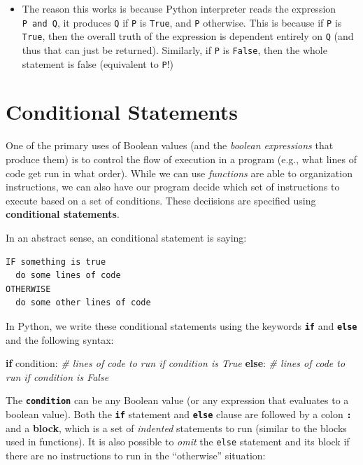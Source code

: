 \documentclass[]{book}
\newenvironment{Shaded}{\begin{snugshade}}{\end{snugshade}}
\newcommand{\CommentTok}[1]{\textcolor[rgb]{0.56,0.35,0.01}{\textit{#1}}}
\newcommand{\ControlFlowTok}[1]{\textcolor[rgb]{0.13,0.29,0.53}{\textbf{#1}}}
\newcommand{\NormalTok}[1]{#1}
\providecommand{\tightlist}{%
  \setlength{\itemsep}{0pt}\setlength{\parskip}{0pt}}
\begin{document}
\begin{itemize}
\tightlist
\item
  The reason this works is because Python interpreter reads the
  expression \texttt{P\ and\ Q}, it produces \texttt{Q} if \texttt{P} is
  \texttt{True}, and \texttt{P} otherwise. This is because if \texttt{P}
  is \texttt{True}, then the overall truth of the expression is
  dependent entirely on \texttt{Q} (and thus that can just be returned).
  Similarly, if \texttt{P} is \texttt{False}, then the whole statement
  is false (equivalent to \texttt{P}!)
\end{itemize}

\hypertarget{conditional-statements}{\section{Conditional
Statements}\label{conditional-statements}}

One of the primary uses of Boolean values (and the \emph{boolean
expressions} that produce them) is to control the flow of execution in a
program (e.g., what lines of code get run in what order). While we can
use \emph{functions} are able to organization instructions, we can also
have our program decide which set of instructions to execute based on a
set of conditions. These deciisions are specified using
\textbf{conditional statements}.

In an abstract sense, an conditional statement is saying:

\begin{verbatim}
IF something is true
  do some lines of code
OTHERWISE
  do some other lines of code
\end{verbatim}

In Python, we write these conditional statements using the keywords
\textbf{\texttt{if}} and \textbf{\texttt{else}} and the following
syntax:

\begin{Shaded}
\begin{Highlighting}[]
\ControlFlowTok{if}\NormalTok{ condition:}
    \CommentTok{# lines of code to run if condition is True}
\ControlFlowTok{else}\NormalTok{:}
    \CommentTok{# lines of code to run if condition is False}
\end{Highlighting}
\end{Shaded}

The \textbf{\texttt{condition}} can be any Boolean value (or any
expression that evaluates to a boolean value). Both the
\textbf{\texttt{if}} statement and \textbf{\texttt{else}} clause are
followed by a colon \textbf{\texttt{:}} and a \textbf{block}, which is a
set of \emph{indented} statements to run (similar to the blocks used in
functions). It is also possible to \emph{omit} the \texttt{else}
statement and its block if there are no instructions to run in the
``otherwise'' situation:
\end{document}
